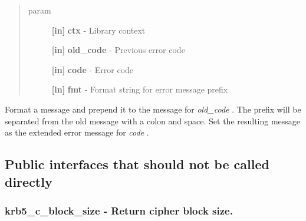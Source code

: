 \documentclass[letterpaper,10pt,english]{sphinxmanual}
\begin{document}
\begin{fulllineitems}
\label{appdev/refs/api/krb5_wrap_error_message:c.krb5_wrap_error_message}
\end{fulllineitems}

\begin{quote}\begin{description}
\item[{param}] \leavevmode
\textbf{{[}in{]}} \textbf{ctx} - Library context

\textbf{{[}in{]}} \textbf{old\_code} - Previous error code

\textbf{{[}in{]}} \textbf{code} - Error code

\textbf{{[}in{]}} \textbf{fmt} - Format string for error message prefix

\end{description}\end{quote}

Format a message and prepend it to the message for \emph{old\_code} . The prefix will be separated from the old message with a colon and space. Set the resulting message as the extended error message for \emph{code} .


\subsection{Public interfaces that should not be called directly}
\label{appdev/refs/api/index:public-interfaces-that-should-not-be-called-directly}

\subsubsection{krb5\_c\_block\_size -  Return cipher block size.}
\label{appdev/refs/api/krb5_c_block_size:krb5-c-block-size-return-cipher-block-size}\label{appdev/refs/api/krb5_c_block_size::doc}

\begin{fulllineitems}
\label{appdev/refs/api/krb5_c_block_size:c.krb5_c_block_size}
\end{fulllineitems}
\end{document}
